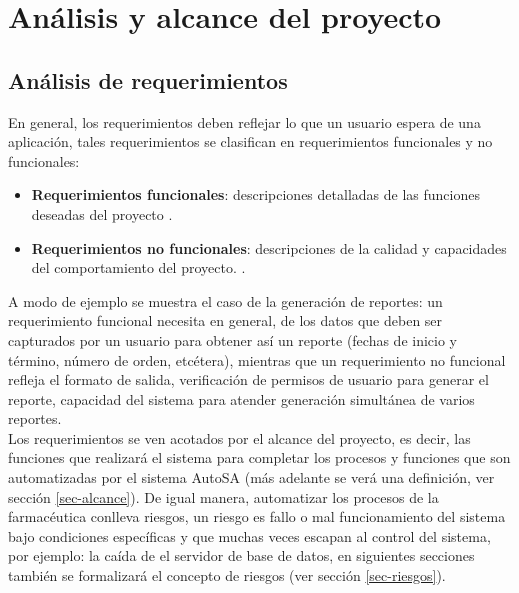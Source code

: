 \chapter{Análisis y alcance del proyecto}\label{cap2}




\section{Análisis de requerimientos}
En general, los requerimientos deben reflejar lo que un usuario espera de una aplicación, tales requerimientos se clasifican en requerimientos funcionales y no funcionales:
\begin{itemize}
\item \textbf{Requerimientos funcionales}: descripciones detalladas de las funciones deseadas del proyecto \cite{WileyBegSE}.
\item \textbf{Requerimientos no funcionales}: descripciones de la calidad y capacidades del comportamiento del proyecto. \cite{WileyBegSE}.
\end{itemize}
A modo de ejemplo se muestra el caso de la generación de reportes: un requerimiento funcional necesita en general, de los datos que deben ser capturados por un usuario para obtener así un reporte (fechas de inicio y término, número de orden, etcétera), mientras que un requerimiento no funcional refleja el formato de salida, verificación de permisos de usuario para generar el reporte,  capacidad del sistema para atender generación simultánea de varios reportes.\\
Los requerimientos se ven acotados por el alcance del proyecto, es decir, las funciones que realizará el sistema para completar los procesos y funciones que son automatizadas por el sistema AutoSA (más adelante se verá una definición, ver sección \ref{sec-alcance}). De igual manera, automatizar los procesos de la farmacéutica conlleva riesgos, un riesgo es fallo o mal funcionamiento del sistema bajo condiciones específicas y que muchas veces escapan al control del sistema, por ejemplo: la caída de el servidor de base de datos, en siguientes secciones también se formalizará el concepto de riesgos (ver sección \ref{sec-riesgos}).


